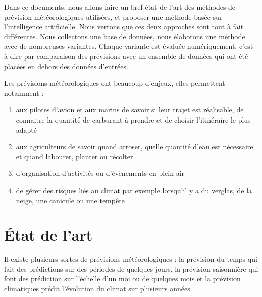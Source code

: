 \documentclass[11pt,a4paper]{article}
\begin{document}
Dans ce documents, nous allons faire un bref état de l'art des méthodes de prévision météorologiques utilisées, et proposer une méthode basée sur l'intelligence artificielle. Nous verrons que ces deux approches sont tout à fait différentes. Nous collectons une base de données, nous élaborons une méthode avec de nombreuses variantes. Chaque variante est évaluée numériquement, c'est à dire par comparaison des prévisions avec un ensemble de données qui ont été placées en dehors des données d'entrées. 

 \vspace {0.6cm}
Les prévisions météorologiques ont beaucoup d'enjeux, elles permettent notamment :
\begin {enumerate}
\item aux pilotes d'avion et aux marins de savoir si leur trajet est réalisable, de connaitre la quantité de carburant à prendre et de choisir l'itinéraire le plus adapté
\item aux agriculteurs de savoir quand arroser, quelle quantité d'eau est nécessaire et quand labourer, planter ou récolter 
\item d'organisation d'activités ou d'évènements en plein air
\item de gérer des risques liés au climat par exemple lorsqu'il y a du verglas, de la neige, une canicule ou une tempête
\end{enumerate}

 
\section{État de l'art}

Il existe plusieurs sortes de prévisions météorologiques : la prévision du temps qui fait des prédictions sur des périodes de quelques jours, la prévision saisonnière qui font des prédiction sur l'échelle d'un moi ou de quelques mois et la prévision climatiques prédit l'évolution du climat sur plusieurs années.
\end{document}
